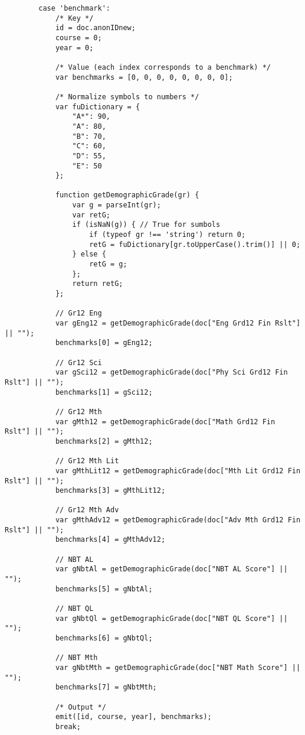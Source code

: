 \begin{verbatim}
        case 'benchmark':
            /* Key */
            id = doc.anonIDnew;
            course = 0;
            year = 0;

            /* Value (each index corresponds to a benchmark) */
            var benchmarks = [0, 0, 0, 0, 0, 0, 0, 0];

            /* Normalize symbols to numbers */
            var fuDictionary = {
                "A*": 90,
                "A": 80,
                "B": 70,
                "C": 60,
                "D": 55,
                "E": 50
            };

            function getDemographicGrade(gr) {
                var g = parseInt(gr);
                var retG;
                if (isNaN(g)) { // True for sumbols
                    if (typeof gr !== 'string') return 0;
                    retG = fuDictionary[gr.toUpperCase().trim()] || 0;
                } else {
                    retG = g;
                };
                return retG;
            };

            // Gr12 Eng
            var gEng12 = getDemographicGrade(doc["Eng Grd12 Fin Rslt"] || "");
            benchmarks[0] = gEng12;

            // Gr12 Sci
            var gSci12 = getDemographicGrade(doc["Phy Sci Grd12 Fin Rslt"] || "");
            benchmarks[1] = gSci12;

            // Gr12 Mth
            var gMth12 = getDemographicGrade(doc["Math Grd12 Fin Rslt"] || "");
            benchmarks[2] = gMth12;

            // Gr12 Mth Lit
            var gMthLit12 = getDemographicGrade(doc["Mth Lit Grd12 Fin Rslt"] || "");
            benchmarks[3] = gMthLit12;

            // Gr12 Mth Adv
            var gMthAdv12 = getDemographicGrade(doc["Adv Mth Grd12 Fin Rslt"] || "");
            benchmarks[4] = gMthAdv12;

            // NBT AL
            var gNbtAl = getDemographicGrade(doc["NBT AL Score"] || "");
            benchmarks[5] = gNbtAl;

            // NBT QL
            var gNbtQl = getDemographicGrade(doc["NBT QL Score"] || "");
            benchmarks[6] = gNbtQl;

            // NBT Mth
            var gNbtMth = getDemographicGrade(doc["NBT Math Score"] || "");
            benchmarks[7] = gNbtMth;

            /* Output */
            emit([id, course, year], benchmarks);
            break;


\end{verbatim}
